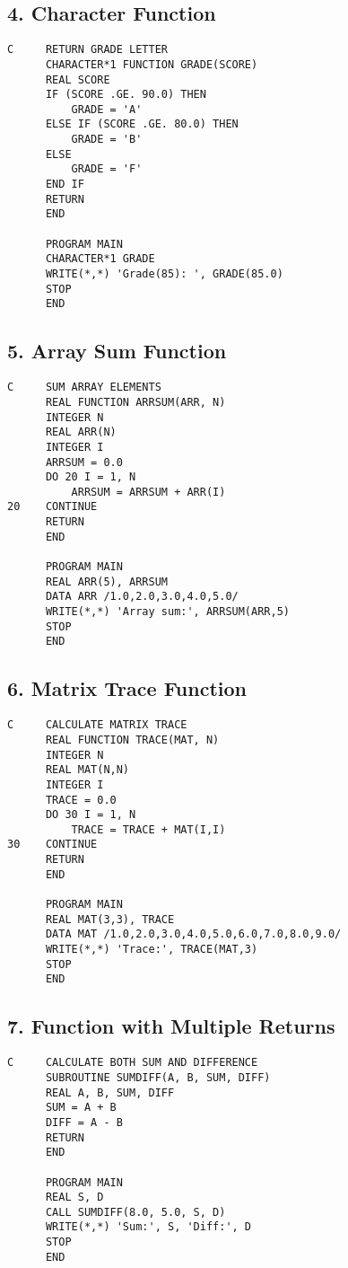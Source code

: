 \documentclass{book}
\begin{document}
\subsection*{4. Character Function}
\begin{verbatim}
C     RETURN GRADE LETTER
      CHARACTER*1 FUNCTION GRADE(SCORE)
      REAL SCORE
      IF (SCORE .GE. 90.0) THEN
          GRADE = 'A'
      ELSE IF (SCORE .GE. 80.0) THEN
          GRADE = 'B'
      ELSE
          GRADE = 'F'
      END IF
      RETURN
      END

      PROGRAM MAIN
      CHARACTER*1 GRADE
      WRITE(*,*) 'Grade(85): ', GRADE(85.0)
      STOP
      END
\end{verbatim}

\subsection*{5. Array Sum Function}
\begin{verbatim}
C     SUM ARRAY ELEMENTS
      REAL FUNCTION ARRSUM(ARR, N)
      INTEGER N
      REAL ARR(N)
      INTEGER I
      ARRSUM = 0.0
      DO 20 I = 1, N
          ARRSUM = ARRSUM + ARR(I)
20    CONTINUE
      RETURN
      END

      PROGRAM MAIN
      REAL ARR(5), ARRSUM
      DATA ARR /1.0,2.0,3.0,4.0,5.0/
      WRITE(*,*) 'Array sum:', ARRSUM(ARR,5)
      STOP
      END
\end{verbatim}

\subsection*{6. Matrix Trace Function}
\begin{verbatim}
C     CALCULATE MATRIX TRACE
      REAL FUNCTION TRACE(MAT, N)
      INTEGER N
      REAL MAT(N,N)
      INTEGER I
      TRACE = 0.0
      DO 30 I = 1, N
          TRACE = TRACE + MAT(I,I)
30    CONTINUE
      RETURN
      END

      PROGRAM MAIN
      REAL MAT(3,3), TRACE
      DATA MAT /1.0,2.0,3.0,4.0,5.0,6.0,7.0,8.0,9.0/
      WRITE(*,*) 'Trace:', TRACE(MAT,3)
      STOP
      END
\end{verbatim}

\subsection*{7. Function with Multiple Returns}
\begin{verbatim}
C     CALCULATE BOTH SUM AND DIFFERENCE
      SUBROUTINE SUMDIFF(A, B, SUM, DIFF)
      REAL A, B, SUM, DIFF
      SUM = A + B
      DIFF = A - B
      RETURN
      END

      PROGRAM MAIN
      REAL S, D
      CALL SUMDIFF(8.0, 5.0, S, D)
      WRITE(*,*) 'Sum:', S, 'Diff:', D
      STOP
      END
\end{verbatim}
\end{document}
